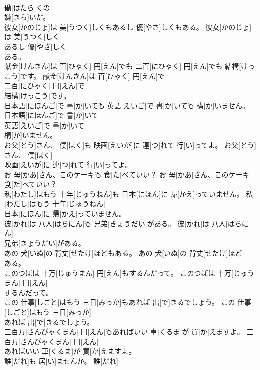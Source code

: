 \documentclass[8pt]{extreport}
\begin{document}
\begin{CJK}{UTF8}{min}
\\	働[はたら]くの
\\	嫌[きら]いだ。	
\\	彼女[かのじょ]は 美[うつく]しくもあるし 優[やさ]しくもある。	彼女[かのじょ]は 美[うつく]しく
\\	あるし 優[やさ]しく
\\	ある。	
\\	献金[けんきん]は 百[ひゃく] 円[えん]でも 二百[にひゃく] 円[えん]でも 結構[けっこう]です。	献金[けんきん]は 百[ひゃく] 円[えん]で
\\	二百[にひゃく] 円[えん]で
\\	結構[けっこう]です。	
\\	日本語[にほんご]で 書[か]いても 英語[えいご]で 書[か]いても 構[か]いません。	日本語[にほんご]で 書[か]いて
\\	英語[えいご]で 書[か]いて
\\	構[か]いません。	
\\	お父[とう]さん、 僕[ぼく]も 映画[えいが]に 連[つ]れて 行[い]ってよ。	お父[とう]さん、 僕[ぼく]
\\	映画[えいが]に 連[つ]れて 行[い]ってよ。	
\\	お 母[かあ]さん、このケーキも 食[た]べていい？	お 母[かあ]さん、このケーキ
\\	食[た]べていい？	
\\	私[わたし]はもう 十年[じゅうねん]も 日本[にほん]に 帰[かえ]っていません。	私[わたし]はもう 十年[じゅうねん]
\\	日本[にほん]に 帰[かえ]っていません。	
\\	彼[かれ]は 八人[はちにん]も 兄弟[きょうだい]がある。	彼[かれ]は 八人[はちにん]
\\	兄弟[きょうだい]がある。	
\\	あの 犬[いぬ]の 背丈[せたけ]ほどもある。	あの 犬[いぬ]の 背丈[せたけ]ほど
\\	ある。	
\\	このつぼは 十万[じゅうまん] 円[えん]もするんだって。	このつぼは 十万[じゅうまん] 円[えん]
\\	するんだって。	
\\	この 仕事[しごと]はもう 三日[みっか]もあれば 出[で]きるでしょう。	この 仕事[しごと]はもう 三日[みっか]
\\	あれば 出[で]きるでしょう。	
\\	三百万[さんびゃくまん] 円[えん]もあればいい 車[くるま]が 買[か]えますよ。	三百万[さんびゃくまん] 円[えん]
\\	あればいい 車[くるま]が 買[か]えますよ。	
\\	誰[だれ]も 居[い]ませんか。	誰[だれ]

\end{CJK}
\end{document}
